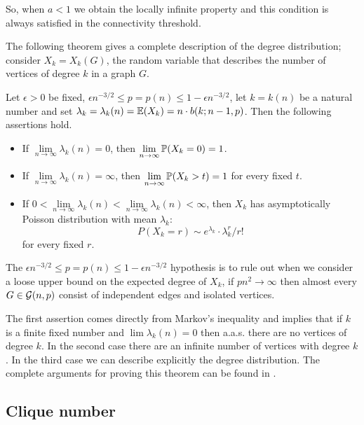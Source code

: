So, when $a<1$ we obtain the locally infinite property and this condition is always satisfied in the connectivity threshold.

The following theorem gives a complete description of the degree distribution; consider $X_{k} = X_{k} (G)$, the random variable that describes the number of vertices of degree $k$ in a graph $G$.

\begin{theorem}\label{degreeTheorem}
Let $\epsilon>0$ be fixed, $\epsilon n^{-3/2} \leq p = p(n) \leq 1 - \epsilon n^{-3/2}$, let $k = k(n)$ be a natural number and set $\lambda_{k} = \lambda_{k}(n) = \E(X_{k}) = n\cdot b(k;n - 1,p)$. Then the following assertions hold.

\begin{itemize}
\item If $\lim\limits_{n\to \infty} \lambda_{k}(n) = 0$, then $\lim\limits_{n\to \infty} \P(X_{k} = 0) = 1$. 
\item If $\lim\limits_{n\to \infty} \lambda_{k}(n) = \infty$, then $\lim\limits_{n\to \infty} \P(X_{k} > t) = 1$
for every fixed $t$.
\item If $0 < \lim\limits_{n\to \infty} \lambda_{k}(n) < \lim\limits_{n\to \infty} \lambda_{k}(n) < \infty$,
then $X_{k}$ has asymptotically Poisson distribution with mean $\lambda_{k}$: 
$$P(X_{k} = r) \sim e^{\lambda_{k}}\cdot \lambda_{k}^{r}/ r!$$
for every fixed $r$.
\end{itemize}
\end{theorem}

The $\epsilon n^{-3/2} \leq p = p(n) \leq 1 - \epsilon n^{-3/2}$ hypothesis is to rule out when we consider a loose upper bound on the expected degree of $X_ {k}$, if $pn^{2} \to \infty $ then almost every $ G \in \G (n, p) $ consist of independent edges and isolated vertices.

The first assertion comes directly from Markov's inequality and implies that if $k$ is a finite fixed number and $\lim \lambda_{k}(n) = 0$ then a.a.s. there are no vertices of degree $k$. In the second case there are an infinite number of vertices with degree $k$. In the third case we can describe explicitly the degree distribution. The complete arguments for proving this theorem can be found in \cite[Bollobás, p.~61]{Bollobas}.

\subsection{Clique number}

